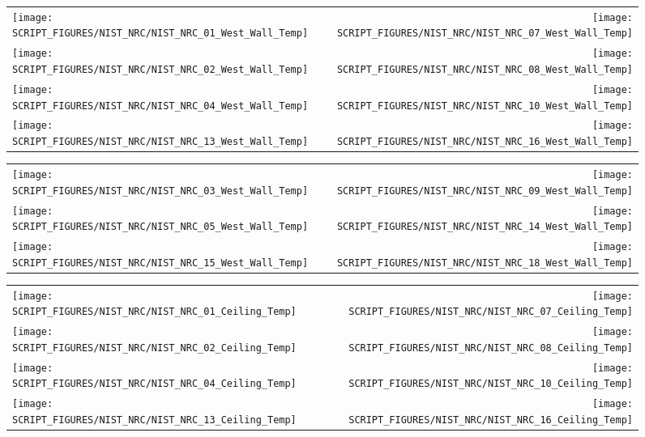 \begin{figure}[!ht]
\begin{tabular*}{\textwidth}{l@{\extracolsep{\fill}}r}
\texttt{[image: SCRIPT\_FIGURES/NIST\_NRC/NIST\_NRC\_01\_West\_Wall\_Temp]} &
\texttt{[image: SCRIPT\_FIGURES/NIST\_NRC/NIST\_NRC\_07\_West\_Wall\_Temp]} \\
\texttt{[image: SCRIPT\_FIGURES/NIST\_NRC/NIST\_NRC\_02\_West\_Wall\_Temp]} &
\texttt{[image: SCRIPT\_FIGURES/NIST\_NRC/NIST\_NRC\_08\_West\_Wall\_Temp]} \\
\texttt{[image: SCRIPT\_FIGURES/NIST\_NRC/NIST\_NRC\_04\_West\_Wall\_Temp]} &
\texttt{[image: SCRIPT\_FIGURES/NIST\_NRC/NIST\_NRC\_10\_West\_Wall\_Temp]} \\
\texttt{[image: SCRIPT\_FIGURES/NIST\_NRC/NIST\_NRC\_13\_West\_Wall\_Temp]} &
\texttt{[image: SCRIPT\_FIGURES/NIST\_NRC/NIST\_NRC\_16\_West\_Wall\_Temp]}
\end{tabular*}
\label{NIST_NRC_West_Wall_Temp_Closed}
\end{figure}

\begin{figure}[!ht]
\begin{tabular*}{\textwidth}{l@{\extracolsep{\fill}}r}
\texttt{[image: SCRIPT\_FIGURES/NIST\_NRC/NIST\_NRC\_03\_West\_Wall\_Temp]} &
\texttt{[image: SCRIPT\_FIGURES/NIST\_NRC/NIST\_NRC\_09\_West\_Wall\_Temp]} \\
\texttt{[image: SCRIPT\_FIGURES/NIST\_NRC/NIST\_NRC\_05\_West\_Wall\_Temp]} &
\texttt{[image: SCRIPT\_FIGURES/NIST\_NRC/NIST\_NRC\_14\_West\_Wall\_Temp]} \\
\texttt{[image: SCRIPT\_FIGURES/NIST\_NRC/NIST\_NRC\_15\_West\_Wall\_Temp]} &
\texttt{[image: SCRIPT\_FIGURES/NIST\_NRC/NIST\_NRC\_18\_West\_Wall\_Temp]}
\end{tabular*}
\label{NIST_NRC_West_Wall_Temp_Open}
\end{figure}

\clearpage

\begin{figure}[!ht]
\begin{tabular*}{\textwidth}{l@{\extracolsep{\fill}}r}
\texttt{[image: SCRIPT\_FIGURES/NIST\_NRC/NIST\_NRC\_01\_Ceiling\_Temp]} &
\texttt{[image: SCRIPT\_FIGURES/NIST\_NRC/NIST\_NRC\_07\_Ceiling\_Temp]} \\
\texttt{[image: SCRIPT\_FIGURES/NIST\_NRC/NIST\_NRC\_02\_Ceiling\_Temp]} &
\texttt{[image: SCRIPT\_FIGURES/NIST\_NRC/NIST\_NRC\_08\_Ceiling\_Temp]} \\
\texttt{[image: SCRIPT\_FIGURES/NIST\_NRC/NIST\_NRC\_04\_Ceiling\_Temp]} &
\texttt{[image: SCRIPT\_FIGURES/NIST\_NRC/NIST\_NRC\_10\_Ceiling\_Temp]} \\
\texttt{[image: SCRIPT\_FIGURES/NIST\_NRC/NIST\_NRC\_13\_Ceiling\_Temp]} &
\texttt{[image: SCRIPT\_FIGURES/NIST\_NRC/NIST\_NRC\_16\_Ceiling\_Temp]}
\end{tabular*}
\label{NIST_NRC_Ceiling_Temp_Closed}
\end{figure}

